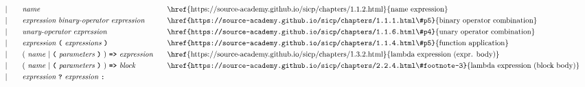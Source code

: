 \begin{alignat*}{9}
&&                       && |   &\quad &&  \textit{name}   && \textrm{\href{https://source-academy.github.io/sicp/chapters/1.1.2.html}{name expression}} \\
&&                       && |   &\quad &&  \textit{expression} \  \textit{binary-operator} \ 
                                            \textit{expression} \qquad
                                                           && \textrm{\href{https://source-academy.github.io/sicp/chapters/1.1.1.html\#p5}{binary operator combination}} \\
&&                       && |   &\quad &&   \textit{unary-operator} \ 
                                            \textit{expression}
                                                           && \textrm{\href{https://source-academy.github.io/sicp/chapters/1.1.6.html\#p4}{unary operator combination}}\\
&&                       && |   &\quad &&   \textit{expression} \ 
                                            \textbf{\texttt{(}}\ \textit{expressions}\
                                            \textbf{\texttt{)}}
                                                           && \textrm{\href{https://source-academy.github.io/sicp/chapters/1.1.4.html\#p5}{function application}} \\
&&                       && |   &\quad &&   (\ \textit{name}\ | \
                                               \textbf{\texttt{(}}\ \textit{parameters}\ \textbf{\texttt{)}}\
                                            )\    
                                            \texttt{\textbf{=>}}\ \textit{expression}
                                                           && \textrm{\href{https://source-academy.github.io/sicp/chapters/1.3.2.html}{lambda expression (expr. body)}} \\
&&                       && |   &\quad &&   (\ \textit{name}\ | \
                                               \textbf{\texttt{(}}\ \textit{parameters}\ \textbf{\texttt{)}}\
                                            )\    
                                            \texttt{\textbf{=>}}\ \textit{block}
                                                           && \textrm{\href{https://source-academy.github.io/sicp/chapters/2.2.4.html\#footnote-3}{lambda expression (block body)}} \\
&&                       && |   &\quad &&   \textit{expression} \ \textbf{\texttt{?}}\ 
                                            \textit{expression}
                                            \ \textbf{\texttt{:}}\

\end{alignat*}
